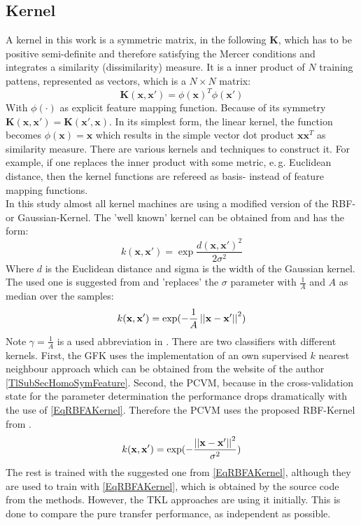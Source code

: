 \subsection{Kernel}\label{EmSubSecKernel}
A kernel in this work is a symmetric matrix, in the following $\mathbf{K}$, which has to be positive semi-definite and therefore satisfying the Mercer conditions and integrates a similarity (dissimilarity) measure.
It is a inner product of $N$ training pattens, represented as vectors, which is a $N \times N$ matrix:
\begin{equation}
	\mathbf{K}(\mathbf{x},\mathbf{x'}) = \phi(\mathbf{x})^T\phi(\mathbf{x'})
\end{equation}
With $\phi(\cdot)$ as explicit feature mapping function.
Because of its symmetry $\mathbf{K}(\mathbf{x},\mathbf{x'})=\mathbf{K}(\mathbf{x'},\mathbf{x})$.
In its simplest form, the linear kernel, the function becomes $\phi(\mathbf{x}) = \mathbf{x}$ which results in the simple vector dot product $\mathbf{x}\mathbf{x}^T$ as similarity measure. There are various kernels and techniques to construct it. For example, if one replaces the inner product with some metric, e.\,g. Euclidean distance, then the kernel functions are refereed as basis- instead of feature mapping functions.\cite[p. 291-296, 329]{Bishop.2009}\\
In this study almost all kernel machines are using a modified version of the \ac{RBF}- or Gaussian-Kernel.
The 'well known' kernel can be obtained from \cite[p. 17]{Vert.2004} and has the form:
\begin{equation}\label{EqRBFOriginalKernel}
	k(\mathbf{x},\mathbf{x}') = \exp\frac{d(\mathbf{x},\mathbf{x}')^2}{2\sigma^2}
\end{equation}
Where $d$ is the Euclidean distance and sigma is the width of the Gaussian kernel.\\
The used one is suggested from \cite{Duan.2012} and 'replaces' the $\sigma$ parameter with $\frac{1}{A}$ and $A$ as median over the samples: 
\begin{equation}\label{EqRBFAKernel}
	k(\mathbf{x},\mathbf{x'}) = \exp(-\frac{1}{A}\left\vert\left\vert\mathbf{x}-\mathbf{x'}\right\vert\right\vert^2)
\end{equation} 
Note $\gamma = \frac{1}{A}$ is a used abbreviation in \cite{Long.2015}.
There are two classifiers with different kernels.
First, the \acs{GFK} uses the implementation of an own supervised $k$ nearest neighbour approach which can be obtained from the website of the author \ref{TlSubSecHomoSymFeature}.
Second, the \acs{PCVM}, because in the cross-validation state for the parameter determination the performance drops dramatically with the use of \eqref{EqRBFAKernel}.
Therefore the \acs{PCVM} uses the proposed \acs{RBF}-Kernel from \cite{Chen.2009}. 
\begin{equation}\label{RBFKernelPCVM}
k(\mathbf{x},\mathbf{x'}) = \exp(-\frac{\left\vert\left\vert\mathbf{x}-\mathbf{x'}\right\vert\right\vert^2}{\sigma^2})
\end{equation}
The rest is trained with the suggested one from \eqref{EqRBFAKernel}, although they are used to train with \eqref{EqRBFAKernel}, which is obtained by the source code from the methods.
However, the \acs{TKL} approaches are using it initially.
This is done to compare the pure transfer performance, as independent as possible.

